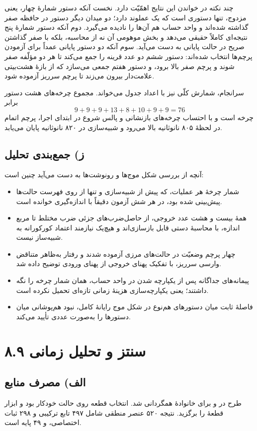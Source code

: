\documentclass[12pt,a4paper]{article}
\begin{document}
	چند نکته در خواندن این نتایج اهمّیّت دارد. نخست آنکه دستور شمارهٔ چهار، یعنی مزدوج، تنها دستوری است که یک عملوند دارد؛ دو میدان دیگر دستور در حافظه صفر گذاشته شده‌اند و واحد حساب هم آن‌ها را نادیده می‌گیرد. دوم آنکه دستور شمارهٔ پنج نتیجه‌ای کاملاً حقیقی می‌دهد و بخش موهومی آن نه از محاسبه، بلکه با صفر گذاشتن صریح در حالت پایانی به دست می‌آید. سوم آنکه دو دستور پایانی عمداً برای آزمودن پرچم‌ها انتخاب شده‌اند: دستور ششم دو عدد قرینه را جمع می‌کند تا هر دو مؤلّفه صفر شوند و پرچم صفر بالا برود، و دستور هفتم جمعی می‌سازد که از بازهٔ هشت‌بیتی علامت‌دار بیرون می‌زند تا پرچم سرریز آزموده شود.

	سرانجام، شمارش کلّی نیز با اعداد جدول می‌خواند. مجموع چرخه‌های هشت دستور برابر
	\[
	9+9+9+13+8+10+9+9 = 76
	\]
	چرخه است و با احتساب چرخه‌های بازنشانی و پالس شروع در ابتدای اجرا، پرچم اتمام در لحظهٔ ۸۰۵ نانوثانیه بالا می‌رود و شبیه‌سازی در ۸۲۰ نانوثانیه پایان می‌یابد.

	\subsection*{ز) جمع‌بندی تحلیل}
	آنچه از بررسی شکل موج‌ها و رونوشت‌ها به دست می‌آید چنین است:
	\begin{itemize}
		\item شمار چرخهٔ هر عملیات، که پیش از شبیه‌سازی و تنها از روی فهرست حالت‌ها پیش‌بینی شده بود، در هر شش آزمون دقیقاً با اندازه‌گیری خوانده است.
		\item همهٔ بیست و هشت عدد خروجی، از حاصل‌ضرب‌های جزئی ضرب مختلط تا مربع اندازه، با محاسبهٔ دستی قابل بازسازی‌اند و هیچ‌یک نیازمند اعتماد کورکورانه به شبیه‌ساز نیست.
		\item چهار پرچم وضعیّت در حالت‌های مرزی آزموده شدند و رفتار به‌ظاهر متناقض وارسی سرریز، با تفکیک پهنای خروجی از پهنای ورودی توضیح داده شد.
		\item پیمانه‌های جداگانه پس از یکپارچه شدن در واحد حساب، همان شمار چرخه را نگه داشتند؛ یعنی یکپارچه‌سازی هزینهٔ زمانی تازه‌ای تحمیل نکرده است.
		\item فاصلهٔ ثابت میان دستورهای هم‌نوع در شکل موج رایانهٔ کامل، نبود هم‌پوشانی میان دستورها را به‌صورت عددی تأیید می‌کند.
	\end{itemize}

	\section*{۸.۹ سنتز و تحلیل زمانی}
	\subsection*{الف) مصرف منابع}
	طرح در  و برای خانوادهٔ  همگردانی شد. انتخاب قطعه روی حالت خودکار بود و ابزار قطعهٔ  را برگزید. نتیجه ۵۲۰ عنصر منطقی شامل ۴۹۷ تابع ترکیبی و ۲۹۸ ثبات اختصاصی، و ۴۹ پایه است.
\end{document}
